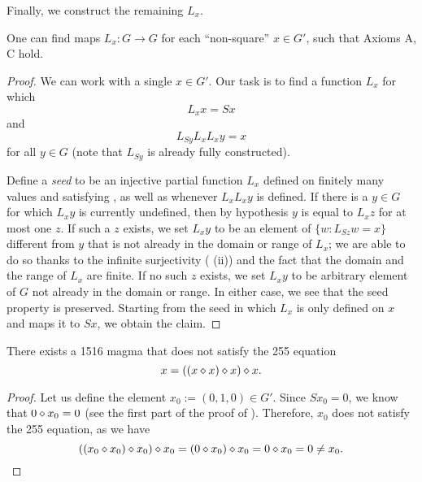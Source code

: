 Finally, we construct the remaining $L_x$.

\begin{proposition}\label{axiom-c} One can find maps $L_x: G \to G$ for each ``non-square'' $x \in G'$, such that Axioms A, C hold.
\end{proposition}

\begin{proof}  We can work with a single $x \in G'$.  Our task is to find a function $L_x$ for which
\begin{equation}\label{axioma-again}
   L_x x = Sx
\end{equation}
and
\begin{equation}\label{axiomb-again}
  L_{Sy} L_x L_x y = x
\end{equation}
for all $y \in G$ (note that $L_{Sy}$ is already fully constructed).

Define a \emph{seed} to be an injective partial function $L_x$ defined on finitely many values and satisfying , as well as  whenever $L_x L_x y$ is defined.
If there is a $y \in G$ for which $L_x y$ is currently undefined, then by hypothesis $y$ is equal to $L_x z$ for at most one $z$.
If such a $z$ exists, we set $L_x y$ to be an element of $\{ w: L_{Sz} w = x \}$ different from $y$ that is not already in the domain or range of $L_x$; we are able to do so thanks to the infinite surjectivity ( (ii)) and the fact that the domain and the range of $L_x$ are finite.
If no such $z$ exists, we set $L_x y$ to be arbitrary element of $G$ not already in the domain or range.  In either case, we see that the seed property is preserved.  Starting from the seed in which $L_x$ is only defined on $x$ and maps it to $Sx$, we obtain the claim.
\end{proof}

\begin{corollary}\label{1516-no-255}  There exists a 1516 magma that does not satisfy the 255 equation $$x = ((x \diamond x) \diamond x) \diamond x.$$
\end{corollary}

\begin{proof}
  Let us define the element $x_0 := (0, 1, 0) \in G'$.
  Since $S x_0 = 0$, we know that $0 \diamond x_0 = 0$ (see the first part of the proof of ).
  Therefore, $x_0$ does not satisfy the 255 equation, as we have
  $$((x_0 \diamond x_0) \diamond x_0) \diamond x_0 = (0 \diamond x_0) \diamond x_0 = 0 \diamond x_0 = 0 \neq x_0.$$
\end{proof}
